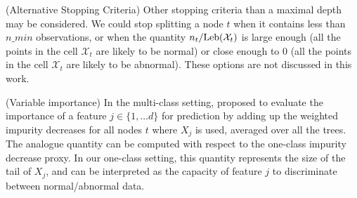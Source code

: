 \begin{remark}({\sc Alternative Stopping Criteria})
Other stopping criteria than a maximal depth may be considered. We could stop splitting a node $t$ when it contains less than $n\_min$ observations, or when the quantity $n_t/\text{Leb}(\mathcal{X}_t)$ is large enough (all the points in the cell $\mathcal{X}_t$ are likely to be normal) or close enough to $0$ (all the points in the cell $\mathcal{X}_t$ are likely to be abnormal). These options are not discussed in this work.
\end{remark}

\begin{remark}({\sc Variable importance})
In the multi-class setting, \cite{Breiman2001} proposed to evaluate the importance of a feature $j \in \{1,\ldots d\}$ for prediction by %
 adding up the weighted impurity decreases %
for all nodes $t$ where $X_j$ is used, averaged over all the trees. The analogue quantity can be computed with respect to the one-class impurity decrease proxy. %
In our one-class setting, this quantity represents the size of the tail of $X_j$, and can be interpreted as the capacity of feature $j$ to discriminate between normal/abnormal data.%
\end{remark}



